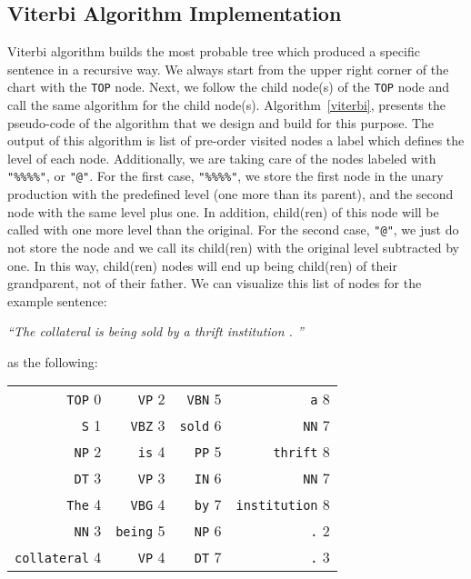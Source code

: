 \documentclass[a4paper,11pt]{article}
\begin{document}
\subsection{Viterbi Algorithm Implementation}
Viterbi algorithm builds the most probable tree which produced a specific sentence in a recursive way. We always start from the upper right corner of the chart with the \texttt{TOP} node. Next, we follow the child node(s) of the \texttt{TOP} node and call the same algorithm for the child node(s). Algorithm~\ref{viterbi}, presents the pseudo-code of  the algorithm that we design and build for this purpose. The output of this algorithm is list of pre-order visited nodes a label which defines the level of each node. Additionally, we are taking care of the nodes labeled with \texttt{"\%\%\%\%"}, or \texttt{"@"}. For the first case, \texttt{"\%\%\%\%"}, we store the first node in the unary production with the predefined level (one more than its parent), and the second node with the same level plus one. In addition, child(ren) of this node will be called with one more level than the original. For the second case, \texttt{"@"}, we just do not store the node and we call its child(ren) with the original level subtracted by one. In this way, child(ren) nodes will end up being child(ren) of their grandparent, not of their father. We can visualize this list of nodes for the example sentence:
\begin{center}
\textit{``The collateral is being sold by a thrift institution . ''}  
\end{center}
as the following:
\begin{table}[h!]
\begin{small}
\begin{center}
\begin{tabular}{ r r r r}
\texttt{TOP} 0 & \texttt{VP} 2& \texttt{VBN} 5& \texttt{a} 8 \\
\texttt{S} 1 & \texttt{VBZ} 3& \texttt{sold} 6& \texttt{NN} 7 \\
\texttt{NP} 2 & \texttt{is} 4& \texttt{PP} 5& \texttt{thrift} 8 \\
\texttt{DT} 3 & \texttt{VP} 3& \texttt{IN} 6& \texttt{NN} 7 \\
\texttt{The} 4& \texttt{VBG} 4& \texttt{by} 7& \texttt{institution} 8 \\
\texttt{NN} 3& \texttt{being} 5& \texttt{NP} 6& \texttt{.} 2 \\
\texttt{collateral} 4& \texttt{VP} 4& \texttt{DT} 7& \texttt{.} 3 \\
\end{tabular}
\end{center}
\end{small}
\end{table}
\end{document}
